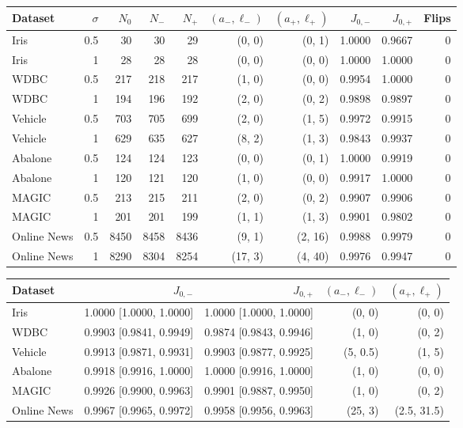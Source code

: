 \begin{table}
\label{tab:matched-retention}
\begin{tabular}{lrrrrrrrrr}
\toprule
Dataset & $\sigma$ & $N_0$ & $N_-$ & $N_+$ & $(a_-,\ell_-)$ & $(a_+,\ell_+)$ & $J_{0,-}$ & $J_{0,+}$ & Flips \\
\midrule
Iris & 0.5 & 30 & 30 & 29 & (0, 0) & (0, 1) & 1.0000 & 0.9667 & 0 \\
Iris & 1 & 28 & 28 & 28 & (0, 0) & (0, 0) & 1.0000 & 1.0000 & 0 \\
WDBC & 0.5 & 217 & 218 & 217 & (1, 0) & (0, 0) & 0.9954 & 1.0000 & 0 \\
WDBC & 1 & 194 & 196 & 192 & (2, 0) & (0, 2) & 0.9898 & 0.9897 & 0 \\
Vehicle & 0.5 & 703 & 705 & 699 & (2, 0) & (1, 5) & 0.9972 & 0.9915 & 0 \\
Vehicle & 1 & 629 & 635 & 627 & (8, 2) & (1, 3) & 0.9843 & 0.9937 & 0 \\
Abalone & 0.5 & 124 & 124 & 123 & (0, 0) & (0, 1) & 1.0000 & 0.9919 & 0 \\
Abalone & 1 & 120 & 121 & 120 & (1, 0) & (0, 0) & 0.9917 & 1.0000 & 0 \\
MAGIC & 0.5 & 213 & 215 & 211 & (2, 0) & (0, 2) & 0.9907 & 0.9906 & 0 \\
MAGIC & 1 & 201 & 201 & 199 & (1, 1) & (1, 3) & 0.9901 & 0.9802 & 0 \\
Online News & 0.5 & 8450 & 8458 & 8436 & (9, 1) & (2, 16) & 0.9988 & 0.9979 & 0 \\
Online News & 1 & 8290 & 8304 & 8254 & (17, 3) & (4, 40) & 0.9976 & 0.9947 & 0 \\
\bottomrule
\end{tabular}
\end{table}

\begin{table}
\label{tab:split-stability}
\begin{tabular}{lrrrr}
\toprule
Dataset & $J_{0,-}$ & $J_{0,+}$ & $(a_-,\ell_-)$ & $(a_+,\ell_+)$ \\
\midrule
Iris & 1.0000 [1.0000, 1.0000] & 1.0000 [1.0000, 1.0000] & (0, 0) & (0, 0) \\
WDBC & 0.9903 [0.9841, 0.9949] & 0.9874 [0.9843, 0.9946] & (1, 0) & (0, 2) \\
Vehicle & 0.9913 [0.9871, 0.9931] & 0.9903 [0.9877, 0.9925] & (5, 0.5) & (1, 5) \\
Abalone & 0.9918 [0.9916, 1.0000] & 1.0000 [0.9916, 1.0000] & (1, 0) & (0, 0) \\
MAGIC & 0.9926 [0.9900, 0.9963] & 0.9901 [0.9887, 0.9950] & (1, 0) & (0, 2) \\
Online News & 0.9967 [0.9965, 0.9972] & 0.9958 [0.9956, 0.9963] & (25, 3) & (2.5, 31.5) \\
\bottomrule
\end{tabular}
\end{table}


